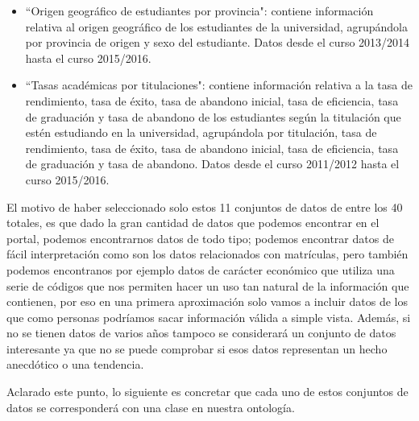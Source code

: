 \begin{itemize}
	\item ``Origen geográfico de estudiantes por provincia": contiene información relativa al origen geográfico de los estudiantes de la universidad, agrupándola por provincia de origen y sexo del estudiante. Datos desde el curso 2013/2014 hasta el curso 2015/2016.
	\item ``Tasas académicas por titulaciones": contiene información relativa a la tasa de rendimiento, tasa de éxito, tasa de abandono inicial, tasa de eficiencia, tasa de graduación y tasa de abandono de los estudiantes según la titulación que estén estudiando en la universidad, agrupándola por titulación, tasa de rendimiento, tasa de éxito, tasa de abandono inicial, tasa de eficiencia, tasa de graduación y tasa de abandono. Datos desde el curso 2011/2012 hasta el curso 2015/2016.
\end{itemize}

El motivo de haber seleccionado solo estos 11 conjuntos de datos de entre los 40 totales, es que dado la gran cantidad de datos que podemos encontrar en el portal, podemos encontrarnos datos de todo tipo; podemos encontrar datos de fácil interpretación como son los datos relacionados con matrículas, pero también podemos encontranos por ejemplo datos de carácter económico que utiliza una serie de códigos que nos permiten hacer un uso tan natural de la información que contienen, por eso en una primera aproximación solo vamos a incluir datos de los que como personas podríamos sacar información válida a simple vista. Además, si no se tienen datos de varios años tampoco se considerará un conjunto de datos interesante ya que no se puede comprobar si esos datos representan un hecho anecdótico o una tendencia.

\bigskip

Aclarado este punto, lo siguiente es concretar que cada uno de estos conjuntos de datos se corresponderá con una clase en nuestra ontología.

